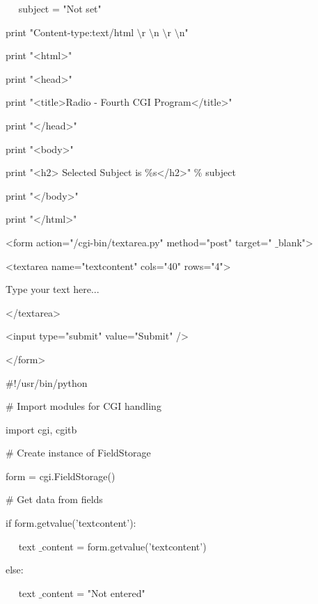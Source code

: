 \begin{12pt}
\begin{12pt}
\begin{12pt}
\begin{12pt}
\begin{12pt}
\begin{12pt}
\begin{12pt}
\noindent 
~~ subject = "Not set" \par
\vspace{12pt}
\noindent 
print "Content-type:text/html $  \setminus  $r $  \setminus  $n $  \setminus  $r $  \setminus  $n" \par
\noindent 
print "<html>" \par
\noindent 
print "<head>" \par
\noindent 
print "<title>Radio - Fourth CGI Program</title>" \par
\noindent 
print "</head>" \par
\noindent 
print "<body>" \par
\noindent 
print "<h2> Selected Subject is  $  \%  $s</h2>"  $  \%  $ subject \par
\noindent 
print "</body>" \par
\noindent 
print "</html>" \par
\vspace{12pt}
\noindent 
<form action="/cgi-bin/textarea.py" method="post" target=" $  \_  $blank"> \par
\noindent 
<textarea name="textcontent" cols="40" rows="4"> \par
\noindent 
Type your text here... \par
\noindent 
</textarea> \par
\noindent 
<input type="submit" value="Submit" /> \par
\noindent 
</form> \par
\vspace{12pt}
\noindent 
 $  \#  $!/usr/bin/python \par
\vspace{12pt}
\noindent 
 $  \#  $ Import modules for CGI handling  \par
\noindent 
import cgi, cgitb  \par
\vspace{12pt}
\noindent 
 $  \#  $ Create instance of FieldStorage  \par
\noindent 
form = cgi.FieldStorage()  \par
\vspace{12pt}
\noindent 
 $  \#  $ Get data from fields \par
\noindent 
if form.getvalue('textcontent'): \par
\noindent 
~~ text $  \_  $content = form.getvalue('textcontent') \par
\noindent 
else: \par
\noindent 
~~ text $  \_  $content = "Not entered" \par

\end{12pt}
\end{12pt}
\end{12pt}
\end{12pt}
\end{12pt}
\end{12pt}
\end{12pt}
